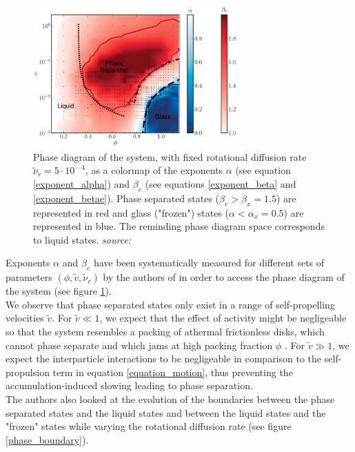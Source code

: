 \documentclass[class=report, float=false, crop=false]{standalone}
\begin{document}
\vspace{-0.5cm}
\begin{figure}[h!]
\centering
\includegraphics[width=0.7\textwidth]{figures/images/phase_diagram.png}
\caption{Phase diagram of the system, with fixed rotational diffusion rate $\tilde{\nu}_r = 5\cdot10^{—4}$, as a colormap of the exponents $\alpha$ (see equation \ref{exponent_alpha}) and $\beta_e$ (see equations \ref{exponent_beta} and \ref{exponent_betae}). Phase separated states ($\beta_e > \beta_x = 1.5$) are represented in red and glass ("frozen") states ($\alpha < \alpha_x = 0.5$) are represented in blue. The reminding phase diagram space corresponds to liquid states. \textit{source:} \cite{fily2014freezing}}
\label{phase_diagram}
\end{figure}

Exponents $\alpha$ and $\beta_e$ have been systematically measured for different sets of parameters $(\phi, \tilde{v}, \tilde{\nu}_r)$ by the authors of \cite{fily2014freezing} in order to access the phase diagram of the system (see figure \ref{phase_diagram}).\\

We observe that phase separated states only exist in a range of self-propelling velocities $\tilde{v}$. For $\tilde{v} \ll 1$, we expect that the effect of activity might be negligeable so that the system resembles a packing of athermal frictionless disks, which cannot phase separate and which jams at high packing fraction $\phi$ \cite{o2003jamming, olsson2007critical}. For $\tilde{v} \gg 1$, we expect the interparticle interactions to be negligeable in comparison to the self-propulsion term in equation \ref{equation_motion}, thus preventing the accumulation-induced slowing leading to phase separation.\\

The authors also looked at the evolution of the boundaries between the phase separated states and the liquid states and between the liquid states and the "frozen" states while varying the rotational diffusion rate (see figure \ref{phase_boundary}).
\end{document}
